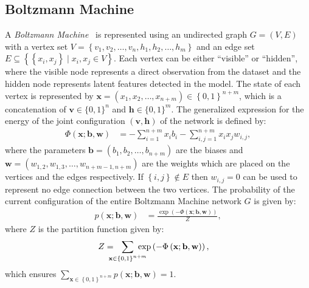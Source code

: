 \documentclass[letterpaper]{article} %
\begin{document}
	\subsection{Boltzmann Machine}
		A \textit{Boltzmann Machine}~\cite{ackley1987learning} is represented using an undirected graph $G = \left( V, E \right)$ with a vertex set $V = \left\{ v_1, v_2, \ldots, v_n, h_1, h_2, \ldots, h_m \right\}$ and an edge set $E \subseteq \left\{ \left\{ x_i, x_j \right\} \mid x_i, x_j \in V \right\}$. Each vertex can be either ``visible'' or ``hidden'', where the visible node represents a direct observation from the dataset and the hidden node represents latent features detected in the model. The state of each vertex is represented by $\mathbf{x} = \left( x_1, x_2, \ldots, x_{n+m} \right) \in \left\{ 0, 1 \right\}^{n+m}$, which is a concatenation of $\mathbf{v} \in \{ 0, 1 \}^n$ and $\mathbf{h} \in \{ 0, 1 \}^m$. The generalized expression for the energy of the joint configuration $\left( \mathbf{v}, \mathbf{h} \right)$ of the network is defined by:
		\begin{align}
			\Phi \left( \mathbf{x}; \mathbf{b}, \mathbf{w} \right) &= - \sum_{i = 1}^{n+m}  x_i b_i - \sum_{i,j = 1}^{n+m} x_i x_j w_{i,j} , \label{eqn:partition_function}
		\end{align}
		where the parameters $\mathbf{b} = \left( b_1, b_2, \ldots, b_{n+m} \right)$ are the biases and $\mathbf{w} = \left( w_{1,2}, w_{1,3}, \ldots, w_{n+m-1, n+m} \right)$ are the weights which are placed on the vertices and the edges respectively. If $\left\{i, j\right\} \notin E$ then $w_{i,j} = 0$ can be used to represent no edge connection between the two vertices. The probability of the current configuration of the entire Boltzmann Machine network $G$ is given by:
		\begin{align}
			p \left( \mathbf{x}; \mathbf{b}, \mathbf{w} \right) &= \frac{\exp \left( - \Phi \left( \mathbf{x}; \mathbf{b}, \mathbf{w} \right) \right)}{Z} , \label{eqn:boltzmann_machine}
		\end{align}
		where $Z$ is the partition function given by:
		\begin{align}
			Z &=\ \ \sum_{\mathclap{\mathbf{x} \in \left\{ 0, 1 \right\}^{n+m}}}\  \exp \left( - \Phi \left( \mathbf{x}; \mathbf{b}, \mathbf{w} \right) \right), \label{eqn:normalization_partition_function}
		\end{align}
		which ensures $\sum_{\mathbf{x} \in \left\{ 0, 1 \right\}^{n+m}} p \left( \mathbf{x}; \mathbf{b}, \mathbf{w} \right) = 1$.
\end{document}
